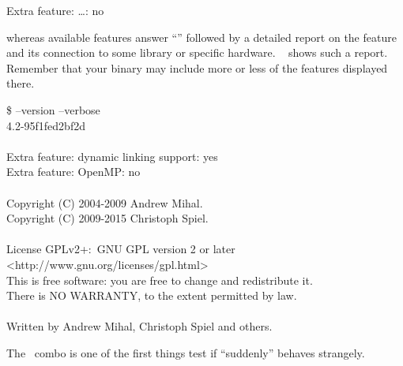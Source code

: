 \begin{literal}
  Extra feature: \dots: no
\end{literal}

whereas available features answer ``'' followed by a detailed report on the feature
and its connection to some library or specific hardware.
\exampleName~ shows such a report.  Remember that your binary
may include more or less of the features displayed there.

\begin{exemplar}
  \begin{maxipage}
    \begin{terminal}
      \$ \app{} --version --verbose \\
        \app{} 4.2-95f1fed2bf2d \\
        ~ \\
        Extra feature: dynamic linking support: yes \\
        Extra feature: OpenMP: no \\
        ~ \\
        Copyright (C) 2004-2009 Andrew Mihal. \\
        Copyright (C) 2009-2015 Christoph Spiel. \\
        ~ \\
        License GPLv2+:~GNU GPL version 2 or later <http://www.gnu.org/licenses/gpl.html> \\
        This is free software: you are free to change and redistribute it. \\
        There is NO WARRANTY, to the extent permitted by law. \\
        ~ \\
        Written by Andrew Mihal, Christoph Spiel and others.
    \end{terminal}
  \end{maxipage}

  \caption[Output of ]%
          {\label{ex:option-version-verbose}%
            Example output of \appcmd{} when called with options 
            and~ together.}
\end{exemplar}

The ~combo is one of the first things test if \appcmd{} ``suddenly''
behaves strangely.


